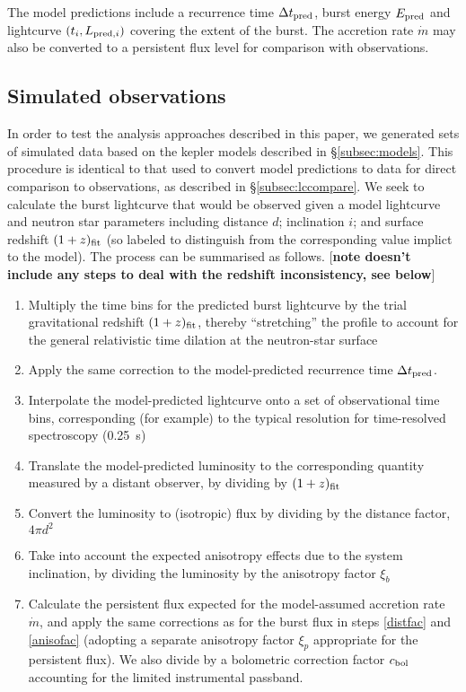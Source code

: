 \documentclass{aastex63}
\begin{document}
The model predictions include a recurrence time $\Delta t_{\rm pred}$, burst energy $E_{\rm pred}$ and lightcurve $(t_i,L_{{\rm pred},i})$ covering the extent of the burst.
%
The accretion rate $\dot{m}$ may also be converted to a persistent flux level for comparison with observations.

\subsection{Simulated observations}
\label{subsec:simobs}

In order to test the analysis approaches described in this paper, we generated sets of simulated data based on the {\sc kepler} models described in \S\ref{subsec:models}. 
%
This procedure is identical to that used to convert model predictions to data for direct comparison to observations, as described in \S\ref{subsec:lccompare}.
%
We seek to calculate the burst lightcurve that would be observed given a model lightcurve and neutron star parameters including distance $d$; inclination $i$; and surface redshift $(1+z)_{\rm fit}$ (so labeled to distinguish from the corresponding value implict to the model). The process can be summarised as follows. [{\bf note doesn't include any steps to deal with the redshift inconsistency, see below}]
\begin{enumerate}
\item Multiply the time bins for the predicted burst lightcurve by the trial gravitational redshift $(1+z)_{\rm fit}$, thereby ``stretching'' the profile to account for the general relativistic time dilation at the neutron-star surface
\item Apply the same correction to the model-predicted recurrence time $\Delta t_{\rm pred}$.
\item Interpolate the model-predicted lightcurve onto a set of observational time bins, corresponding (for example) to the typical resolution for time-resolved spectroscopy (0.25~s)
\item Translate the model-predicted luminosity to the corresponding quantity measured by a distant observer, by 
dividing by $(1+z)_{\rm fit}$
\item Convert the luminosity to (isotropic) flux by dividing by the distance factor, $4\pi d^2$ \label{distfac}
\item Take into account the expected anisotropy effects due to the system inclination, by dividing the luminosity by the anisotropy factor $\xi_b$ \label{anisofac}
\item Calculate the persistent flux expected for the model-assumed accretion rate $\dot{m}$, and apply the same corrections as for the burst flux in steps \ref{distfac} and \ref{anisofac} (adopting a separate anisotropy factor $\xi_p$ appropriate for the persistent flux). We also divide by a bolometric correction factor $c_{\rm bol}$ accounting for the limited instrumental passband.
\end{enumerate}
\end{document}
